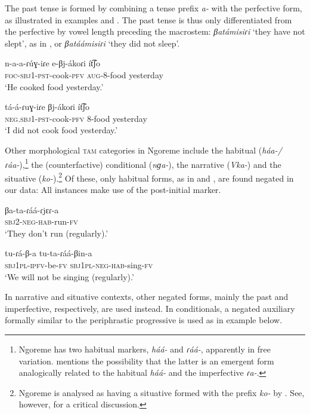 \documentclass[output=paper,colorlinks,citecolor=brown,draftmode]{langscibook}
\begin{document}
The past tense is formed by combining a tense prefix \textit{a-} with the perfective form, as illustrated in examples  and . The past tense is thus only differentiated from the perfective by vowel length preceding the macrostem: \textit{βatámisiɾi} ‘they have not slept’, as in , or \textit{βatáámisiɾi} ‘they did not sleep’.

\ea\label{ex:ngo:12} 
    \gll n-a-a-ɾúɣ{}-iɾe e{}-βj{}-ákoɾi ít͡ʃo\\ 
        \textsc{foc-sbj}1\textsc{{}-pst}{}-cook-\textsc{pfv} \textsc{aug{}-}8-food yesterday\\
    \glt ‘He cooked food yesterday.’
\z 

\ea\label{ex:ngo:13} 
    \gll tá-á-ɾuɣ-iɾe βj-ákoɾi ít͡ʃo\\ 
    \textsc{neg.sbj1{}-pst}{}-cook-\textsc{pfv} 8-food yesterday \\
    \glt ‘I did not cook food yesterday.’
\z 

Other morphological \textsc{tam} categories in Ngoreme include the habitual (\textit{háa-/ɾáa-}),\footnote{Ngoreme has two habitual markers, \textit{háá-} and \textit{ɾáá-}, apparently in free variation. \citet[73]{Roth2018} mentions the possibility that the latter is an emergent form analogically related to the habitual \textit{háá-} and the imperfective \textit{ɾa-}.} the (counterfactive) conditional (\textit{nɡa-}), the narrative (\textit{Vka-}) and the situative (\textit{ko-}).\footnote{Ngoreme is analysed as having a situative formed with the prefix \textit{ko-} by \citet{Roth2018}. See, however, \citet[171–174]{Laine2023} for a critical discussion.} Of these, only habitual forms, as in  and , are found negated in our data: All instances make use of the post-initial marker.

\ea\label{ex:ngo:14} 
    \gll βa-ta-ɾáá-ɾjɛɾ-a\\ 
     \textsc{sbj}2-\textsc{neg-hab}{}-run-\textsc{fv}\\
    \glt ‘They don’t run (regularly).’
\z 

\ea\label{ex:ngo:15} 
    \gll tu-ɾá-β-a tu-ta-ɾáá-βin-a \\ 
         \textsc{sbj1pl-ipfv-}be\textsc{-fv} \textsc{sbj1pl-neg-hab}-sing-\textsc{fv}\\
     \glt ‘We will not be singing (regularly).’
\z 

In narrative and situative contexts, other negated forms, mainly the past and imperfective, respectively, are used instead. In conditionals, a negated auxiliary formally similar to the periphrastic progressive is used as in example  below.
\end{document}
